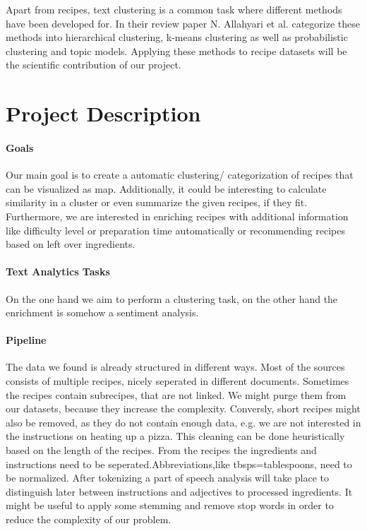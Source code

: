 \documentclass[
     12pt,         %
     a4paper,      %
     BCOR10mm,     %
     DIV14,        %
     ]{article}
\begin{document}
Apart from recipes, text clustering is a common task where different methods have been developed for. In their review paper N. Allahyari et al. categorize these methods into hierarchical clustering, k-means clustering as well as probabilistic clustering and topic models. Applying these methods to recipe datasets will be the scientific contribution of our project.




\section{Project Description}

\paragraph{Goals} Our main goal is to create a automatic clustering/ categorization  of recipes that can be visualized as map.  Additionally, it could be interesting to calculate similarity in a cluster or even summarize the given recipes, if they fit. Furthermore, we are interested in enriching recipes with 
additional information like difficulty level or preparation time automatically or recommending recipes based on left over ingredients.

\paragraph{Text Analytics Tasks} On the one hand we aim to perform a clustering task, on the other hand the enrichment  is somehow a sentiment analysis. %

\paragraph{Pipeline} The data we found is already structured in different ways. Most of the sources consists of multiple recipes, nicely seperated in different documents.
Sometimes the recipes contain subrecipes, that are not linked. We might purge them from our datasets, because they increase the complexity. Conversly, short recipes 
might also be removed, as they do not contain enough data, e.g. we are not interested in the instructions on heating up a pizza.
This cleaning can be done heuristically based on the length of the recipes. From the recipes the ingredients and instructions need to be seperated.Abbreviations,like tbsps=tablespoons,
need to be normalized.
After tokenizing a part of speech analysis will take place to distinguish later between instructions and adjectives to processed ingredients.
It might  be useful to apply some stemming and remove stop words in order to reduce the complexity of our problem. 
\end{document}
